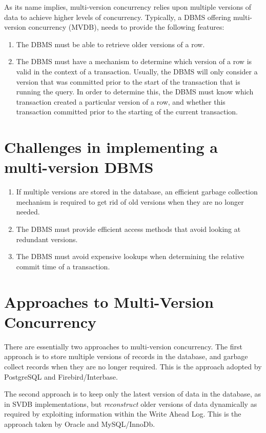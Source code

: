 \documentclass{article}
\begin{document}
As its name implies, multi-version concurrency relies upon multiple
versions of data to achieve higher levels of concurrency. Typically,
a DBMS offering multi-version concurrency (MVDB), needs to provide
the following features:

\begin{enumerate}
\item The DBMS must be able to retrieve older versions of a row.
\item The DBMS must have a mechanism to determine which
version of a row is valid in the context of a transaction. Usually,
the DBMS will only consider a version that was committed prior to
the start of the transaction that is running the query. In order to
determine this, the DBMS must know which transaction created a
particular version of a row, and whether this transaction committed
prior to the starting of the current transaction.
\end{enumerate}

\section{Challenges in implementing a multi-version DBMS}

\begin{enumerate}
\item If multiple versions are stored in the database, an
efficient garbage collection mechanism is required to get rid of old
versions when they are no longer needed.
\item The DBMS must provide efficient access methods that
avoid looking at redundant versions.
\item The DBMS must avoid
expensive lookups when determining the relative commit time of a
transaction.
\end{enumerate}

\section{Approaches to Multi-Version Concurrency}

There are essentially two approaches to multi-version concurrency.
The first approach is to store multiple versions of records in the
database, and garbage collect records when they are no longer
required. This is the approach adopted by PostgreSQL and
Firebird/Interbase.

The second approach is to keep only the latest version of data in
the database, as in SVDB implementations, but \emph{reconstruct}
older versions of data dynamically as required by exploiting
information within the Write Ahead Log. This is the approach taken
by Oracle and MySQL/InnoDb.
\end{document}
